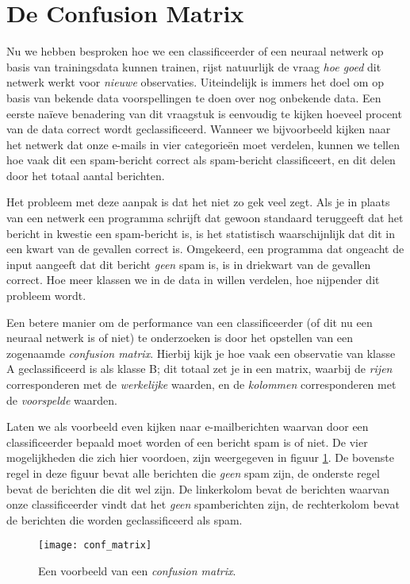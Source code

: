 
\section{De Confusion Matrix}
Nu we hebben besproken hoe we een classificeerder of een neuraal netwerk op basis van trainingsdata kunnen trainen, rijst natuurlijk de vraag \textit{hoe goed} dit netwerk werkt voor \textit{nieuwe} observaties. Uiteindelijk is immers het doel om op basis van bekende data voorspellingen te doen over nog onbekende data. Een eerste naïeve benadering van dit vraagstuk is eenvoudig te kijken hoeveel procent van de data correct wordt geclassificeerd. Wanneer we bijvoorbeeld kijken naar het netwerk dat onze e-mails in vier categorieën moet verdelen, kunnen we tellen hoe vaak dit een spam-bericht correct als spam-bericht classificeert, en dit delen door het totaal aantal berichten.

Het probleem met deze aanpak is dat het niet zo gek veel zegt. Als je in plaats van een netwerk een programma schrijft dat gewoon standaard teruggeeft dat het bericht in kwestie een spam-bericht is, is het statistisch waarschijnlijk dat dit in een kwart van de gevallen correct is. Omgekeerd, een programma dat ongeacht de input aangeeft dat dit bericht \textit{geen} spam is, is in driekwart van de gevallen correct. Hoe meer klassen we in de data in willen verdelen, hoe nijpender dit probleem wordt.

Een betere manier om de performance van een classificeerder (of dit nu een neuraal netwerk is of niet) te onderzoeken is door het opstellen van een zogenaamde \textit{confusion matrix}. Hierbij kijk je hoe vaak een observatie van klasse A geclassificeerd is als klasse B; dit totaal zet je in een matrix, waarbij de \textit{rijen} corresponderen met de \textit{werkelijke} waarden, en de \textit{kolommen} corresponderen met de \textit{voorspelde} waarden. 

Laten we als voorbeeld even kijken naar e-mailberichten waarvan door een classificeerder bepaald moet worden of een bericht spam is of niet. De vier mogelijkheden die zich hier voordoen, zijn weergegeven in figuur \ref{img:conf_matrix1}. De bovenste regel in deze figuur bevat alle berichten die \textit{geen} spam zijn, de onderste regel bevat de berichten die dit wel zijn. De linkerkolom bevat de berichten waarvan onze classificeerder vindt dat het \textit{geen} spamberichten zijn, de rechterkolom bevat de berichten die worden geclassificeerd als spam.

\begin{figure}[h]
\centering
\texttt{[image: conf\_matrix]}
\caption{Een voorbeeld van een \textit{confusion matrix}.\label{img:conf_matrix1}}
\end{figure}

